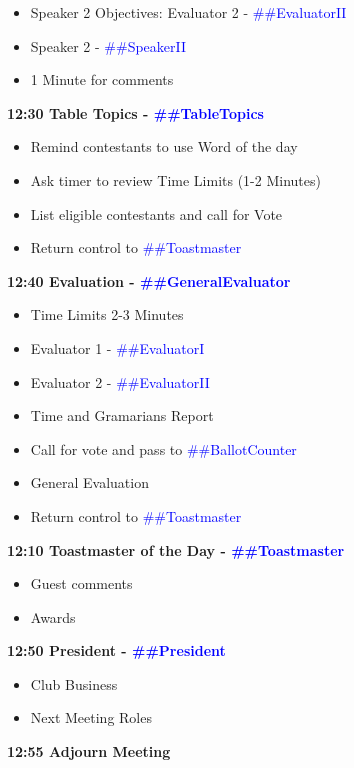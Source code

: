 \documentclass{article}
\newcommand{\toastmaster}{##Toastmaster}
\newcommand{\president}{##President}
\newcommand{\tableTopics}{##TableTopics}
\newcommand{\generalEvaluator}{##GeneralEvaluator}
\newcommand{\evaluatorI}{##EvaluatorI}
\newcommand{\evaluatorII}{##EvaluatorII}
\newcommand{\speakerII}{##SpeakerII}
\newcommand{\ballotCounter}{##BallotCounter}
\newcommand{\speechIITitle}{##SpeechIITitle}
\newcommand{\speechIIProject}{##SpeechIIProject}
\newcommand{\speechIITimeConstraints}{##SpeechIITimeConstraints}
\begin{document}
\begin{spacing}{.8}
\begin{itemize}
    \item Speaker 2 Objectives: Evaluator 2 - \textcolor{blue}{\evaluatorII{}}
    \item Speaker 2 - \textcolor{blue}{\speakerII{}}
    \item 1 Minute for comments
  \end{itemize}
  {\Large \bf12:30 Table Topics - \textcolor{blue}{\tableTopics{}}} 
  \begin{itemize}
    \item Remind contestants to use Word of the day
    \item Ask timer to review Time Limits  (1-2 Minutes)
    \item List eligible contestants and call for Vote
    \item Return control to \textcolor{blue}{\toastmaster{}}
  \end{itemize}
  {\Large \bf12:40 Evaluation - \textcolor{blue}{\generalEvaluator{}}} 
  \begin{itemize}
    \item Time Limits 2-3 Minutes
    \item Evaluator 1 - \textcolor{blue}{\evaluatorI{}}
    \item Evaluator 2 - \textcolor{blue}{\evaluatorII{}}
	\item Time and Gramarians Report
    \item Call for vote and pass to \textcolor{blue}{\ballotCounter{}}
	\item General Evaluation
    \item Return control to \textcolor{blue}{\toastmaster{}}
  \end{itemize}
  {\Large \bf12:10 Toastmaster of the Day - \textcolor{blue}{\toastmaster{}}} 
  \begin{itemize}
    \item Guest comments
    \item Awards
  \end{itemize}
  {\Large \bf12:50 President - \textcolor{blue}{\president{}}} 
  \begin{itemize}
    \item Club Business
    \item Next Meeting Roles
  \end{itemize}
  {\Large \bf12:55 Adjourn Meeting} 
  \end{spacing}
  
\end{document}
